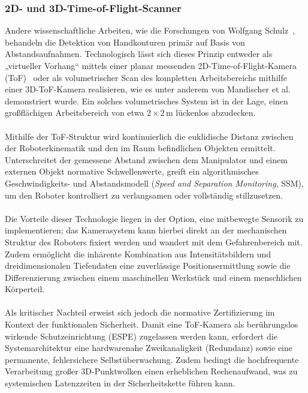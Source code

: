 \subsubsection{2D- und 3D-Time-of-Flight-Scanner}
Andere wissenschaftliche Arbeiten, wie die Forschungen von Wolfgang Schulz~\cite{SCH05}, behandeln die Detektion von Handkonturen primär auf Basis von Abstandsaufnahmen. Technologisch lässt sich dieses Prinzip entweder als „virtueller Vorhang“ mittels einer planar messenden 2D-Time-of-Flight-Kamera (ToF)~\cite{SCH05} oder als volumetrischer Scan des kompletten Arbeitsbereichs mithilfe einer 3D-ToF-Kamera realisieren, wie es unter anderem von Mandischer et al.~\cite{mandischer2022noncontact} demonstriert wurde. Ein solches volumetrisches System ist in der Lage, einen großflächigen Arbeitsbereich von etwa $2 \times 2\,\text{m}$ lückenlos abzudecken. 
\\
\\Mithilfe der ToF-Struktur wird kontinuierlich die euklidische Distanz zwischen der Roboterkinematik und den im Raum befindlichen Objekten ermittelt. Unterschreitet der gemessene Abstand zwischen dem Manipulator und einem externen Objekt normative Schwellenwerte, greift ein algorithmisches Geschwindigkeits- und Abstandsmodell (\textit{Speed and Separation Monitoring}, SSM), um den Roboter kontrolliert zu verlangsamen oder vollständig stillzusetzen. 
\\
\\Die Vorteile dieser Technologie liegen in der Option, eine mitbewegte Sensorik zu implementieren; das Kamerasystem kann hierbei direkt an der mechanischen Struktur des Roboters fixiert werden und wandert mit dem Gefahrenbereich mit. Zudem ermöglicht die inhärente Kombination aus Intensitätsbildern und dreidimensionalen Tiefendaten eine zuverlässige Positionsermittlung sowie die Differenzierung zwischen einem maschinellen Werkstück und einem menschlichen Körperteil. 
\\
\\Als kritischer Nachteil erweist sich jedoch die normative Zertifizierung im Kontext der funktionalen Sicherheit. Damit eine ToF-Kamera als berührungslos wirkende Schutzeinrichtung (ESPE) zugelassen werden kann, erfordert die Systemarchitektur eine hardwarenahe Zweikanaligkeit (Redundanz) sowie eine permanente, fehlersichere Selbstüberwachung. Zudem bedingt die hochfrequente Verarbeitung großer 3D-Punktwolken einen erheblichen Rechenaufwand, was zu systemischen Latenzzeiten in der Sicherheitskette führen kann.

